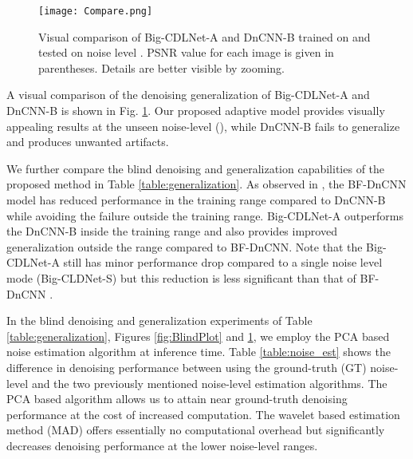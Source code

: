 \documentclass[conference]{IEEEtran}
\begin{document}
\begin{figure}[ht]
\centering
\texttt{[image: Compare.png]}
\caption{Visual comparison of Big-CDLNet-A and DnCNN-B trained on  and tested on noise level . PSNR value for each image is given in parentheses. Details are better visible by zooming.}
\label{fig:Parrot}
\end{figure}

A visual comparison of the denoising generalization of Big-CDLNet-A and DnCNN-B is shown in Fig. \ref{fig:Parrot}. Our proposed adaptive model provides visually appealing results at the unseen noise-level (), while DnCNN-B fails to generalize and produces unwanted artifacts.

We further compare the blind denoising and generalization capabilities of the proposed method in Table \ref{table:generalization}. As observed in \cite{Mohan2020}, the BF-DnCNN model has reduced performance in the training range compared to DnCNN-B while avoiding the failure outside the training range. Big-CDLNet-A outperforms the DnCNN-B inside the training range and also provides improved generalization outside the range compared to BF-DnCNN. Note that the Big-CDLNet-A still has minor performance drop compared to a single noise level mode (Big-CLDNet-S) but this reduction is less significant than that of BF-DnCNN \cite{Mohan2020}. 

\begin{table}[ht]
\centering
\caption{Blind denoising and generalization comparison to DnCNN-B \cite{DnCNN} and BF-CNN \cite{Mohan2020}. All models are trained on . Average test PSNR on BSD68 \cite{bsd} is reported.}
\label{table:generalization}
\end{table}

In the blind denoising and generalization experiments of Table \ref{table:generalization}, Figures \ref{fig:BlindPlot} and \ref{fig:Parrot}, we employ the PCA based noise estimation algorithm \cite{Liu2013} at inference time. Table \ref{table:noise_est} shows the difference in denoising performance between using the ground-truth (GT)  noise-level and the two previously mentioned noise-level estimation algorithms. The PCA based algorithm allows us to attain near ground-truth denoising performance at the cost of increased computation. The wavelet based estimation method (MAD) offers essentially no computational overhead but significantly decreases denoising performance at the lower noise-level ranges.
\end{document}
